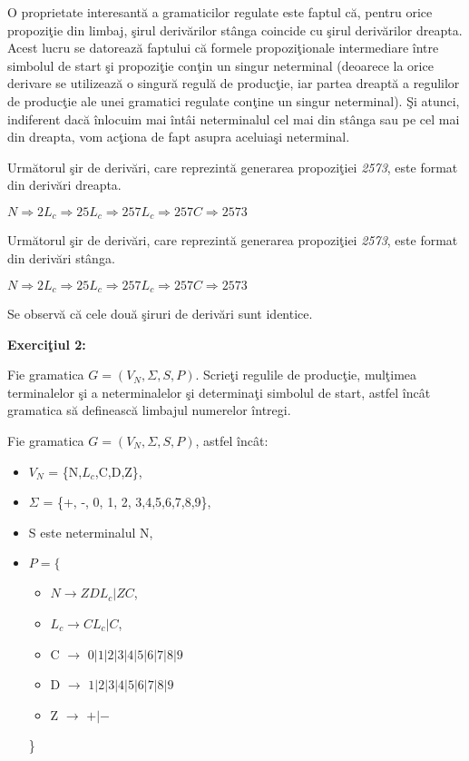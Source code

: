 O proprietate interesantă a gramaticilor regulate este faptul că, pentru orice propoziţie din limbaj, şirul derivărilor stânga coincide cu şirul derivărilor dreapta. Acest lucru se datorează faptului că formele propoziţionale intermediare între simbolul de start şi propoziţie conţin un singur neterminal (deoarece la orice derivare se utilizează o singură regulă de producţie, iar partea dreaptă a regulilor de producţie ale unei gramatici regulate conţine un singur neterminal). Şi atunci, indiferent dacă înlocuim mai întâi neterminalul cel mai din stânga sau pe cel mai din dreapta, vom acţiona de fapt asupra aceluiaşi neterminal.

Următorul şir de derivări, care reprezintă generarea propoziţiei \textit{2573}, este format din derivări dreapta.

$ N \Rightarrow 2 L_c \Rightarrow 25L_c \Rightarrow 257L_c \Rightarrow 257C  \Rightarrow 2573$

Următorul şir de derivări, care reprezintă generarea propoziţiei \textit{2573}, este format din derivări stânga.

$ N \Rightarrow 2 L_c \Rightarrow 25L_c \Rightarrow 257L_c \Rightarrow 257C  \Rightarrow 2573$

Se observă că cele două şiruri de derivări sunt identice.

\textbf{Exerciţiul 2:}

Fie gramatica $G = (V_{N}, \Sigma, S, P)$. Scrieţi regulile de producţie, mulţimea terminalelor şi a neterminalelor şi determinaţi simbolul de start, astfel încât gramatica să definească limbajul numerelor întregi.

Fie gramatica $G = (V_{N}, \Sigma, S, P)$, astfel încât:

\begin{itemize}
\item
$V_{N}$ = \{N,$L_c$,C,D,Z\},
\item
$\Sigma$ = \{+, -, 0, 1, 2, 3,4,5,6,7,8,9\},
\item
S este neterminalul N,
\item
$P = \{$
\begin{itemize}
\item
$N \rightarrow ZDL_c | ZC$,
\item
$L_c \rightarrow CL_c | C$,
\item
C $\rightarrow$ $0|1|2|3|4|5|6|7|8|9$
\item
D $\rightarrow$ $1|2|3|4|5|6|7|8|9$
\item
Z $\rightarrow$  $+|-$
\end{itemize}
\}
\end{itemize}

